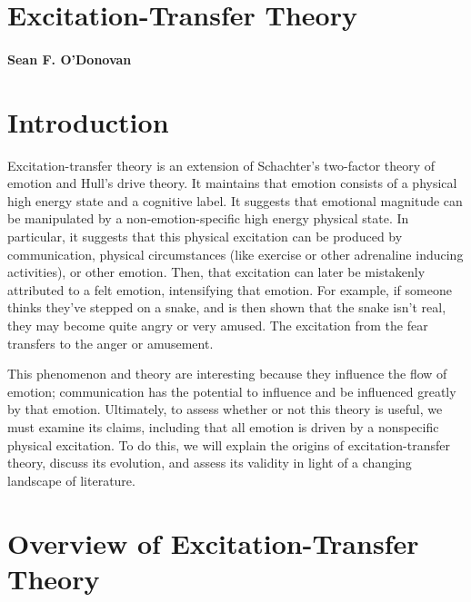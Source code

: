 \hypertarget{header}{}
\hypertarget{excitation-transfer-theory}{%
\section{Excitation-Transfer Theory}\label{excitation-transfer-theory}}

\hypertarget{sean-f.-odonovan}{%
\paragraph{Sean F. O'Donovan}\label{sean-f.-odonovan}}

\hypertarget{introduction}{%
\section{Introduction}\label{introduction}}

Excitation-transfer theory is an extension of Schachter's two-factor
theory of emotion and Hull's drive theory. It maintains that emotion
consists of a physical high energy state and a cognitive label. It
suggests that emotional magnitude can be manipulated by a
non-emotion-specific high energy physical state. In particular, it
suggests that this physical excitation can be produced by communication,
physical circumstances (like exercise or other adrenaline inducing
activities), or other emotion. Then, that excitation can later be
mistakenly attributed to a felt emotion, intensifying that emotion. For
example, if someone thinks they've stepped on a snake, and is then shown
that the snake isn't real, they may become quite angry or very amused.
The excitation from the fear transfers to the anger or amusement.

This phenomenon and theory are interesting because they influence the
flow of emotion; communication has the potential to influence and be
influenced greatly by that emotion. Ultimately, to assess whether or not
this theory is useful, we must examine its claims, including that all
emotion is driven by a nonspecific physical excitation. To do this, we
will explain the origins of excitation-transfer theory, discuss its
evolution, and assess its validity in light of a changing landscape of
literature.

\hypertarget{overview-of-excitation-transfer-theory}{%
\section{Overview of Excitation-Transfer
Theory}\label{overview-of-excitation-transfer-theory}}

